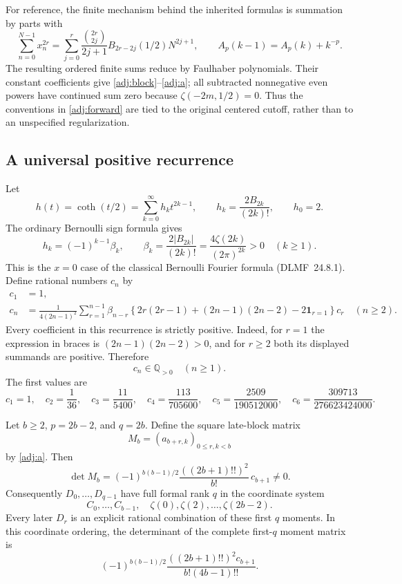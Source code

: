 For reference, the finite mechanism behind the inherited formulas is
summation by parts with
\[
 \sum_{n=0}^{N-1}x_n^{2r}
 =\sum_{j=0}^{r}\frac{\binom{2r}{2j}}{2j+1}
 B_{2r-2j}(1/2)N^{2j+1},
 \qquad A_p(k-1)=A_p(k)+k^{-p}.
\]
The resulting ordered finite sums reduce by Faulhaber polynomials.
Their constant coefficients give \eqref{adj:block}--\eqref{adj:a};
all subtracted nonnegative even powers have continued sum zero because
$\zeta(-2m,1/2)=0$.  Thus the conventions in
\eqref{adj:forward} are tied to the original centered cutoff, rather
than to an unspecified regularization.

\subsection{A universal positive recurrence}

Let
\[
 h(t)=\coth(t/2)=\sum_{k=0}^{\infty}h_k t^{2k-1},\qquad
 h_k=\frac{2B_{2k}}{(2k)!},\qquad h_0=2.
\]
The ordinary Bernoulli sign formula gives
\begin{equation}\label{adj:hsign}
 h_k=(-1)^{k-1}\beta_k,\qquad
 \beta_k=\frac{2|B_{2k}|}{(2k)!}
 =\frac{4\zeta(2k)}{(2\pi)^{2k}}>0\quad(k\ge1).
\end{equation}
This is the $x=0$ case of the classical Bernoulli Fourier formula
(DLMF~24.8.1).  Define rational numbers $c_n$ by
\begin{align}
 c_1&=1,\label{adj:c1}\\
 c_n&=\frac{1}{4(2n-1)^2}
 \sum_{r=1}^{n-1}\beta_{n-r}
 \left\{2r(2r-1)+(2n-1)(2n-2)-2\mathbf1_{r=1}\right\}c_r
 \quad(n\ge2).
 \label{adj:positive-recurrence}
\end{align}
Every coefficient in this recurrence is strictly positive.  Indeed,
for $r=1$ the expression in braces is $(2n-1)(2n-2)>0$, and for
$r\ge2$ both its displayed summands are positive.  Therefore
\begin{equation}\label{adj:cpositive}
 c_n\in\mathbb Q_{>0}\quad(n\ge1).
\end{equation}
The first values are
\[
 c_1=1,\quad c_2=\frac1{36},\quad c_3=\frac{11}{5400},\quad
 c_4=\frac{113}{705600},\quad
 c_5=\frac{2509}{190512000},\quad
 c_6=\frac{309713}{276623424000}.
\]

\begin{theorem}
\label{adj:main}
Let $b\ge2$, $p=2b-2$, and $q=2b$.  Define the square late-block
matrix
\[
 M_b=(a_{b+r,k})_{0\le r,k<b}
\]
by \eqref{adj:a}.  Then
\begin{equation}\label{adj:determinant}
 \det M_b=
 (-1)^{b(b-1)/2}\frac{((2b+1)!!)^2}{b!}\,c_{b+1}\ne0.
\end{equation}
Consequently $D_0,\ldots,D_{q-1}$ have full formal rank $q$ in
the coordinate system
\[
 C_0,\ldots,C_{b-1},\quad\zeta(0),\zeta(2),\ldots,\zeta(2b-2).
\]
Every later $D_r$ is an explicit rational combination of these first
$q$ moments.  In this coordinate ordering, the determinant of the
complete first-$q$ moment matrix is
\begin{equation}\label{adj:full-determinant}
 (-1)^{b(b-1)/2}
 \frac{((2b+1)!!)^2c_{b+1}}{b!(4b-1)!!}.
\end{equation}
\end{theorem}

